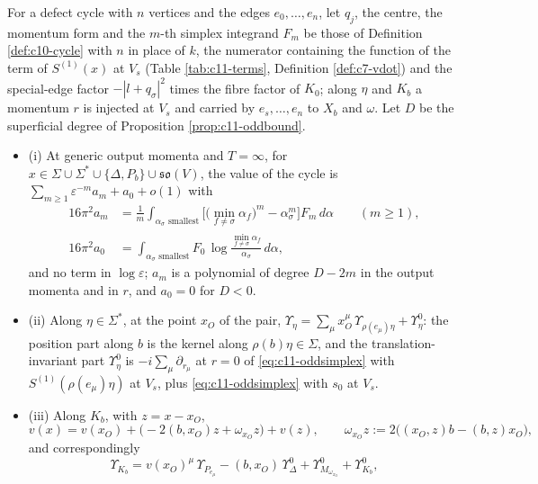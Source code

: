\begin{theorem}
\label{thm:c11-oddsimplex}
For a defect cycle with $n$ vertices and the edges $e_0,\dots,e_n$, let $q_j$, the centre, the momentum form and the $m$-th simplex integrand $F_m$ be those of Definition \ref{def:c10-cycle} with $n$ in place of $k$, the numerator containing the function of the term of $S^{(1)}(x)$ at $V_s$ (Table \ref{tab:c11-terms}, Definition \ref{def:c7-vdot}) and the special-edge factor $-|l+q_\sigma|^2$ times the fibre factor of $K_0$; along $\eta$ and $K_b$ a momentum $r$ is injected at $V_s$ and carried by $e_s,\dots,e_n$ to $X_b$ and $\omega$. Let $D$ be the superficial degree of Proposition \ref{prop:c11-oddbound}.
\begin{itemize}
\item (i) At generic output momenta and $T=\infty$, for $x\in\Sigma\cup\Sigma^*\cup\{\Delta,P_b\}\cup\mathfrak{so}(V)$, the value of the cycle is $\sum_{m\ge1}\varepsilon^{-m}a_m+a_0+o(1)$ with
\begin{equation}
\begin{aligned}
16\pi^2a_m&=\frac1m\int_{\alpha_\sigma\text{ smallest}}\Big[\big(\min_{f\ne\sigma}\alpha_f\big)^m-\alpha_\sigma^m\Big]F_m\,d\alpha\qquad(m\ge1),\\
16\pi^2a_0&=\int_{\alpha_\sigma\text{ smallest}}F_0\,\log\frac{\min_{f\ne\sigma}\alpha_f}{\alpha_\sigma}\,d\alpha,
\end{aligned}
\label{eq:c11-oddsimplex}
\end{equation}
and no term in $\log\varepsilon$; $a_m$ is a polynomial of degree $D-2m$ in the output momenta and in $r$, and $a_0=0$ for $D<0$.
\item (ii) Along $\eta\in\Sigma^*$, at the point $x_O$ of the pair, $\Upsilon_\eta=\sum_\mu x_O^\mu\,\Upsilon_{\rho(e_\mu)\eta}+\Upsilon^0_\eta$: the position part along $b$ is the kernel along $\rho(b)\eta\in\Sigma$, and the translation-invariant part $\Upsilon^0_\eta$ is $-i\sum_\mu\partial_{r_\mu}$ at $r=0$ of \eqref{eq:c11-oddsimplex} with $S^{(1)}(\rho(e_\mu)\eta)$ at $V_s$, plus \eqref{eq:c11-oddsimplex} with $s_0$ at $V_s$.
\item (iii) Along $K_b$, with $z=x-x_O$,
\[
v(x)=v(x_O)+\big(-2(b,x_O)z+\omega_{x_O}z\big)+v(z),\qquad \omega_{x_O}z:=2\big((x_O,z)b-(b,z)x_O\big),
\]
and correspondingly
\begin{equation}
\Upsilon_{K_b}=v(x_O)^\mu\,\Upsilon_{P_{e_\mu}}-(b,x_O)\,\Upsilon^0_\Delta+\Upsilon^0_{M_{\omega_{x_O}}}+\Upsilon^0_{K_b},
\label{eq:c11-Kdec}
\end{equation}

\end{itemize}
\end{theorem}
